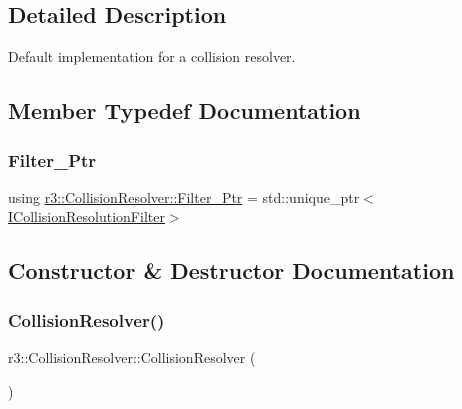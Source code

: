 \subsection{Detailed Description}
Default implementation for a collision resolver. 

\subsection{Member Typedef Documentation}
\mbox{\label{classr3_1_1_collision_resolver_ad1c9ca40341498c0fe4d483d21c8eb9b}} 
\subsubsection{\texorpdfstring{Filter\+\_\+\+Ptr}{Filter\_Ptr}}
{\footnotesize\ttfamily using \mbox{\hyperlink{classr3_1_1_collision_resolver_ad1c9ca40341498c0fe4d483d21c8eb9b}{r3\+::\+Collision\+Resolver\+::\+Filter\+\_\+\+Ptr}} =  std\+::unique\+\_\+ptr$<$\mbox{\hyperlink{classr3_1_1_i_collision_resolution_filter}{I\+Collision\+Resolution\+Filter}}$>$}



\subsection{Constructor \& Destructor Documentation}
\mbox{\label{classr3_1_1_collision_resolver_a7b90e276403fa8422879228a189432fb}} 
\subsubsection{\texorpdfstring{Collision\+Resolver()}{CollisionResolver()}}
{\footnotesize\ttfamily r3\+::\+Collision\+Resolver\+::\+Collision\+Resolver (\begin{DoxyParamCaption}{ }\end{DoxyParamCaption})\hspace{0.3cm}{\ttfamily [explicit]}}

